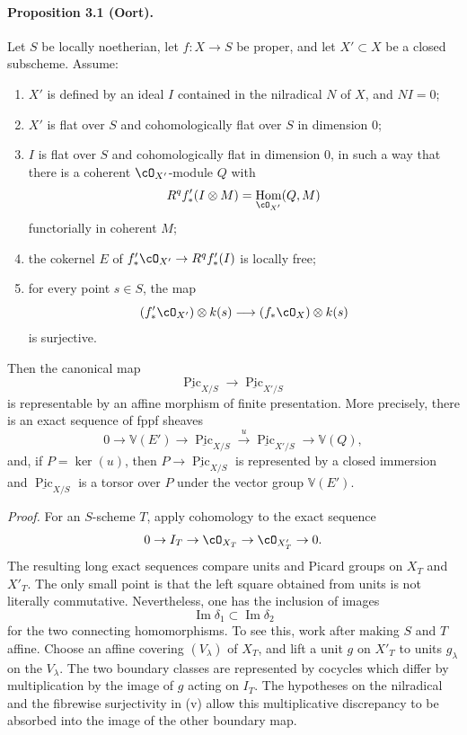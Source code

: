 \documentclass[11pt]{article}
\theoremstyle{plain}
\theoremstyle{definition}
\theoremstyle{remark}
\DeclareMathOperator{\Hom}{Hom}
\DeclareMathOperator{\Pic}{Pic}
\newcommand{\longto}{\longrightarrow}
\providecommand{\xto}[1]{\xrightarrow{#1}}
\begin{document}
\paragraph{Proposition 3.1 (Oort).}
Let $S$ be locally noetherian, let $f:X\to S$ be proper, and let $X'\subset X$ be a closed subscheme. Assume:
\begin{enumerate}[label=\roman*)]
\item $X'$ is defined by an ideal $I$ contained in the nilradical $N$ of $X$, and $NI=0$;
\item $X'$ is flat over $S$ and cohomologically flat over $S$ in dimension $0$;
\item $I$ is flat over $S$ and cohomologically flat in dimension $0$, in such a way that there is a coherent $\cO_{X'}$-module $Q$ with
\[
R^qf'_*(I\otimes M)=\Hom_{\cO_{X'}}(Q,M)
\]
functorially in coherent $M$;
\item the cokernel $E$ of $f'_*\cO_{X'}\to R^qf'_*(I)$ is locally free;
\item for every point $s\in S$, the map
\[
(f'_*\cO_{X'})\otimes k(s)\longto (f_*\cO_X)\otimes k(s)
\]
is surjective.
\end{enumerate}
Then the canonical map
\[
\underline{\Pic}_{X/S}\longto \underline{\Pic}_{X'/S}
\]
is representable by an affine morphism of finite presentation. More precisely, there is an exact sequence of fppf sheaves
\[
0\to\mathbb V(E')\to\underline{\Pic}_{X/S}\xto{u}\underline{\Pic}_{X'/S}\to\mathbb V(Q),
\]
and, if $P=\ker(u)$, then $P\to\underline{\Pic}_{X/S}$ is represented by a closed immersion and $\underline{\Pic}_{X/S}$ is a torsor over $P$ under the vector group $\mathbb V(E')$.

\emph{Proof.}
For an $S$-scheme $T$, apply cohomology to the exact sequence
\[
0\to I_T\to\cO_{X_T}\to\cO_{X'_T}\to0.
\]
The resulting long exact sequences compare units and Picard groups on $X_T$ and $X'_T$. The only small point is that the left square obtained from units is not literally commutative. Nevertheless, one has the inclusion of images
\[
\operatorname{Im}\delta_1\subset\operatorname{Im}\delta_2
\]
for the two connecting homomorphisms. To see this, work after making $S$ and $T$ affine. Choose an affine covering $(V_\lambda)$ of $X_T$, and lift a unit $g$ on $X'_T$ to units $g_\lambda$ on the $V_\lambda$. The two boundary classes are represented by cocycles which differ by multiplication by the image of $g$ acting on $I_T$. The hypotheses on the nilradical and the fibrewise surjectivity in (v) allow this multiplicative discrepancy to be absorbed into the image of the other boundary map.
\end{document}

